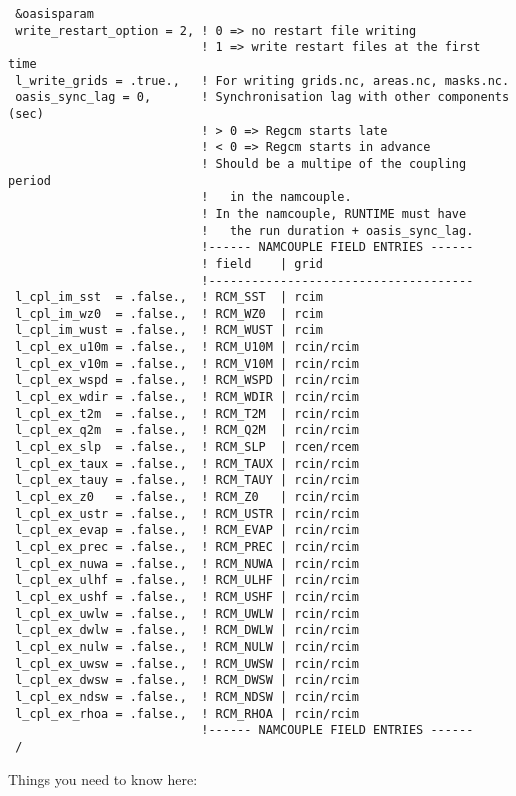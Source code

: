 {\footnotesize
\begin{Verbatim}
 &oasisparam
 write_restart_option = 2, ! 0 => no restart file writing
                           ! 1 => write restart files at the first time
 l_write_grids = .true.,   ! For writing grids.nc, areas.nc, masks.nc.
 oasis_sync_lag = 0,       ! Synchronisation lag with other components (sec)
                           ! > 0 => Regcm starts late
                           ! < 0 => Regcm starts in advance
                           ! Should be a multipe of the coupling period
                           !   in the namcouple.
                           ! In the namcouple, RUNTIME must have
                           !   the run duration + oasis_sync_lag.
                           !------ NAMCOUPLE FIELD ENTRIES ------
                           ! field    | grid
                           !-------------------------------------
 l_cpl_im_sst  = .false.,  ! RCM_SST  | rcim
 l_cpl_im_wz0  = .false.,  ! RCM_WZ0  | rcim
 l_cpl_im_wust = .false.,  ! RCM_WUST | rcim
 l_cpl_ex_u10m = .false.,  ! RCM_U10M | rcin/rcim
 l_cpl_ex_v10m = .false.,  ! RCM_V10M | rcin/rcim
 l_cpl_ex_wspd = .false.,  ! RCM_WSPD | rcin/rcim
 l_cpl_ex_wdir = .false.,  ! RCM_WDIR | rcin/rcim
 l_cpl_ex_t2m  = .false.,  ! RCM_T2M  | rcin/rcim
 l_cpl_ex_q2m  = .false.,  ! RCM_Q2M  | rcin/rcim
 l_cpl_ex_slp  = .false.,  ! RCM_SLP  | rcen/rcem
 l_cpl_ex_taux = .false.,  ! RCM_TAUX | rcin/rcim
 l_cpl_ex_tauy = .false.,  ! RCM_TAUY | rcin/rcim
 l_cpl_ex_z0   = .false.,  ! RCM_Z0   | rcin/rcim
 l_cpl_ex_ustr = .false.,  ! RCM_USTR | rcin/rcim
 l_cpl_ex_evap = .false.,  ! RCM_EVAP | rcin/rcim
 l_cpl_ex_prec = .false.,  ! RCM_PREC | rcin/rcim
 l_cpl_ex_nuwa = .false.,  ! RCM_NUWA | rcin/rcim
 l_cpl_ex_ulhf = .false.,  ! RCM_ULHF | rcin/rcim
 l_cpl_ex_ushf = .false.,  ! RCM_USHF | rcin/rcim
 l_cpl_ex_uwlw = .false.,  ! RCM_UWLW | rcin/rcim
 l_cpl_ex_dwlw = .false.,  ! RCM_DWLW | rcin/rcim
 l_cpl_ex_nulw = .false.,  ! RCM_NULW | rcin/rcim
 l_cpl_ex_uwsw = .false.,  ! RCM_UWSW | rcin/rcim
 l_cpl_ex_dwsw = .false.,  ! RCM_DWSW | rcin/rcim
 l_cpl_ex_ndsw = .false.,  ! RCM_NDSW | rcin/rcim
 l_cpl_ex_rhoa = .false.,  ! RCM_RHOA | rcin/rcim
                           !------ NAMCOUPLE FIELD ENTRIES ------
 /
\end{Verbatim}
}

Things you need to know here:

